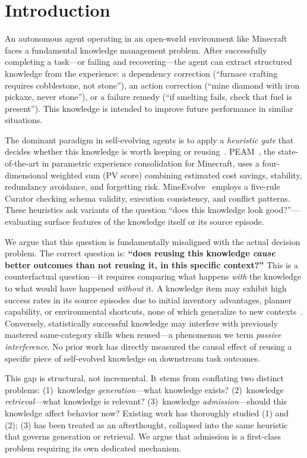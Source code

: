 \documentclass[letterpaper]{article}
\begin{document}
\section{Introduction}

An autonomous agent operating in an open-world environment like Minecraft faces a fundamental knowledge management problem. After successfully completing a task---or failing and recovering---the agent can extract structured knowledge from the experience: a dependency correction (``furnace crafting requires cobblestone, not stone''), an action correction (``mine diamond with iron pickaxe, never stone''), or a failure remedy (``if smelting fails, check that fuel is present''). This knowledge is intended to improve future performance in similar situations.

The dominant paradigm in self-evolving agents is to apply a \emph{heuristic gate} that decides whether this knowledge is worth keeping or reusing~\cite{voyager2023,mineevolve2026,peam2026}. PEAM~\cite{peam2026}, the state-of-the-art in parametric experience consolidation for Minecraft, uses a four-dimensional weighted sum (PV score) combining estimated cost savings, stability, redundancy avoidance, and forgetting risk. MineEvolve~\cite{mineevolve2026} employs a five-rule Curator checking schema validity, execution consistency, and conflict patterns. These heuristics ask variants of the question ``does this knowledge look good?''---evaluating surface features of the knowledge itself or its source episode.

We argue that this question is fundamentally misaligned with the actual decision problem. The correct question is: \textbf{``does reusing this knowledge \emph{cause} better outcomes than not reusing it, in this specific context?''} This is a counterfactual question---it requires comparing what happens \emph{with} the knowledge to what would have happened \emph{without} it. A knowledge item may exhibit high success rates in its source episodes due to initial inventory advantages, planner capability, or environmental shortcuts, none of which generalize to new contexts~\cite{mineexplorer2025}. Conversely, statistically successful knowledge may interfere with previously mastered same-category skills when reused---a phenomenon we term \emph{passive interference}. No prior work has directly measured the causal effect of reusing a specific piece of self-evolved knowledge on downstream task outcomes.

This gap is structural, not incremental. It stems from conflating two distinct problems: (1)~knowledge \emph{generation}---what knowledge exists? (2)~knowledge \emph{retrieval}---what knowledge is relevant? (3)~knowledge \emph{admission}---should this knowledge affect behavior now? Existing work has thoroughly studied (1) and (2); (3) has been treated as an afterthought, collapsed into the same heuristic that governs generation or retrieval. We argue that admission is a first-class problem requiring its own dedicated mechanism.
\end{document}
